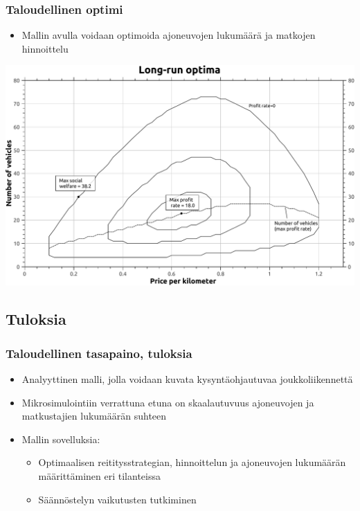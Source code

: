 \documentclass{beamer}
\begin{document}
 
\begin{frame}
  \frametitle{Taloudellinen optimi}   %
\begin{itemize}
\item
Mallin avulla voidaan optimoida ajoneuvojen lukumäärä ja matkojen hinnoittelu
\end{itemize}
\begin{center}
 \includegraphics[scale=0.3]{a-optima02}
\end{center}
\end{frame}



\subsection{Tuloksia}
\begin{frame}
  \frametitle{Taloudellinen tasapaino, tuloksia}   %
\begin{itemize}
\item
Analyyttinen malli, jolla voidaan kuvata kysyntäohjautuvaa joukkoliikennettä 
\item
Mikrosimulointiin verrattuna etuna on skaalautuvuus ajoneuvojen ja matkustajien lukumäärän suhteen
\item
Mallin sovelluksia:
\begin{itemize}
 \item 
Optimaalisen reititysstrategian, hinnoittelun ja ajoneuvojen lukumäärän määrittäminen eri tilanteissa
\item
Säännöstelyn vaikutusten tutkiminen 
\end{itemize}
\end{itemize}
\end{frame}
\end{document}
